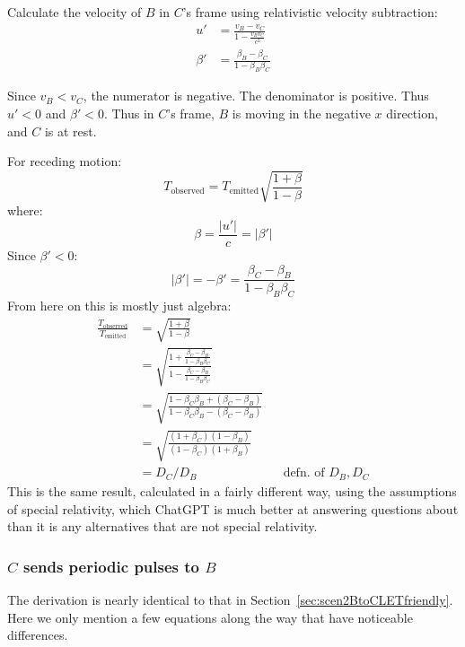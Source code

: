 \documentclass[a4paper]{article}
\theoremstyle{plain}
\theoremstyle{definition}
\begin{document}
Calculate the velocity of $B$ in $C$'s frame using relativistic
velocity subtraction:
\begin{align}
u' & = \frac{v_B - v_C}{1 - \frac{v_B v_C}{c^2}} \\
\beta' & = \frac{\beta_B - \beta_C}{1 - \beta_B \beta_C}
\end{align}

Since $v_B < v_C$, the numerator is negative.  The denominator is
positive.  Thus $u' < 0$ and $\beta' < 0$.  Thus in $C$'s frame, $B$
is moving in the negative $x$ direction, and $C$ is at rest.

For receding motion:
\begin{equation}
T_{\text{observed}} = T_{\text{emitted}} \sqrt{ \frac{1+\beta}{1-\beta} }
\end{equation}
where:
\begin{equation}
\beta = \frac{|u'|}{c} = |\beta'|
\end{equation}
Since $\beta' < 0$:
\begin{equation}
|\beta'| = -\beta' = \frac{\beta_C - \beta_B}{1 - \beta_B \beta_C}
\end{equation}
From here on this is mostly just algebra:
\begin{align*}
\frac{T_{\text{observed}}}{T_{\text{emitted}}}
  & = \sqrt{ \frac{1+\beta}{1-\beta} } \\
  & = \sqrt{ \frac{1 + \frac{\beta_C - \beta_B}{1 - \beta_B \beta_C}}{1 - \frac{\beta_C - \beta_B}{1 - \beta_B \beta_C}} } \\
  & = \sqrt{ \frac{1 - \beta_C \beta_B + (\beta_C - \beta_B)}{1 - \beta_C \beta_B - (\beta_C - \beta_B)} } \\
  & = \sqrt{ \frac{(1 + \beta_C) (1 - \beta_B)}{(1 - \beta_C) (1 + \beta_B)} } \\
  & = D_C / D_B & & \text{defn. of $D_B, D_C$}
\end{align*}
This is the same result, calculated in a fairly different way, using
the assumptions of special relativity, which ChatGPT is much better at
answering questions about than it is any alternatives that are not
special relativity.


\subsubsection{$C$ sends periodic pulses to $B$}
\label{sec:scen2CtoBLETfriendly}

The derivation is nearly identical to that in
Section~\ref{sec:scen2BtoCLETfriendly}.
Here we only mention a few equations along the way that have
noticeable differences.
\end{document}
